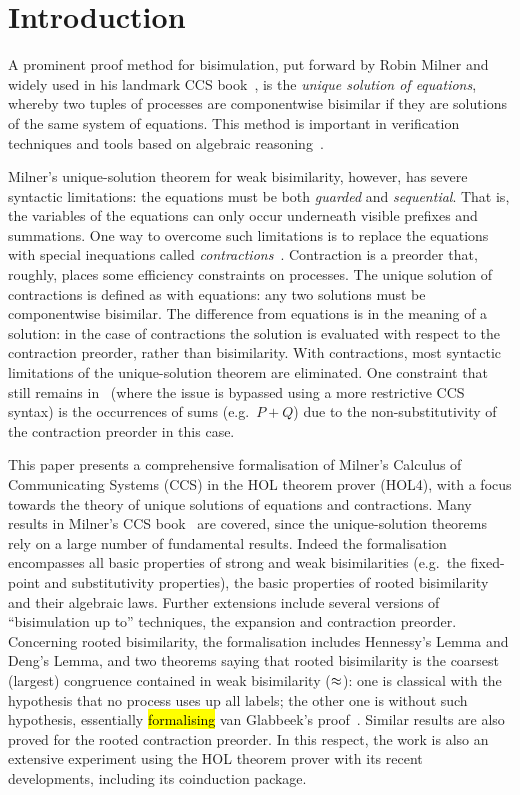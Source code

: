 \section{Introduction}

A prominent proof method for bisimulation, put forward by Robin Milner and widely used in his
landmark CCS book~\cite{Mil89}, is the
\emph{unique solution of equations}, whereby two tuples of processes are
componentwise bisimilar if they are solutions of the same system of equations.
This method is important in verification techniques and tools
based on algebraic reasoning~\cite{BaeBOOK,theoryAndPractice,RosUnder10}. 

Milner's unique-solution theorem for weak bisimilarity, however,
has severe syntactic limitations:
the equations must be both \emph{guarded} and \emph{sequential}. That is,
the variables of the equations can only occur underneath visible prefixes and summations.
One way to overcome such limitations is to replace the equations
with special inequations called
\emph{contractions}~\cite{sangiorgi2015equations,sangiorgi2017equations}. Contraction is a
preorder that, roughly, places some efficiency constraints on processes.
The unique solution of contractions is defined as with equations:
any two solutions must be componentwise bisimilar.
The difference from equations is in the meaning of a solution:
in the case of contractions the solution is evaluated with respect to
the contraction preorder, rather than bisimilarity. 
With contractions, most syntactic limitations of the unique-solution theorem are
eliminated. One constraint that still remains
in~\cite{sangiorgi2017equations}
(where the issue is bypassed using a more
restrictive CCS syntax)
is the occurrences of sums (e.g.~$P + Q$) due to
the non-substitutivity of the contraction preorder in this case.

This paper presents a comprehensive formalisation of Milner's Calculus of Communicating
Systems (CCS) in the HOL theorem prover (HOL4),
with a focus towards the theory of unique solutions of equations and contractions.
Many results in Milner's CCS book~\cite{Mil89} are covered, since
the unique-solution theorems rely on a large number of fundamental results.
Indeed the formalisation encompasses all basic properties of strong and weak
bisimilarities (e.g.~the fixed-point and substitutivity properties), the
basic properties of rooted bisimilarity and their algebraic laws.
Further extensions include several versions of ``bisimulation up to''
techniques, the expansion and contraction preorder.
Concerning rooted bisimilarity, the formalisation
includes Hennessy's Lemma and Deng's Lemma,
 and two theorems saying that rooted bisimilarity is the coarsest (largest)
 congruence contained in weak bisimilarity ($\approx$): one is classical
 with the hypothesis that no process uses up all labels;
the other one is 
without such hypothesis, essentially \hl{formalising} van Glabbeek's proof~\cite{van2005characterisation}.
Similar results are also proved for the rooted contraction preorder.
In this respect, the work is also an extensive experiment using the HOL theorem prover with its
recent developments, including its coinduction package.

